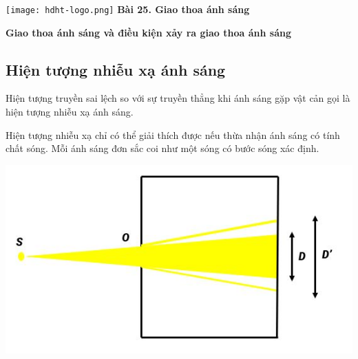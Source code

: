 \newcommand{\chapter}[2][]{
	\newcommand{\chapname}{#2}
	\begin{flushleft}
		\begin{minipage}[t]{\linewidth}
			\texttt{[image: hdht-logo.png]}
			\hspace{0pt}	
			\sffamily\bfseries\large Bài  25. Giao thoa ánh sáng
			\begin{flushleft}
				\huge\bfseries #1
			\end{flushleft}
		\end{minipage}
	\end{flushleft}
	\vspace{1cm}
	\normalfont\normalsize
}
\chapter[Giao thoa ánh sáng và điều kiện xảy ra giao thoa ánh sáng]{Giao thoa ánh sáng \\và điều kiện xảy ra giao thoa ánh sáng}

\subsection{Hiện tượng nhiễu xạ ánh sáng}
Hiện tượng truyền sai lệch so với sự truyền thẳng khi ánh sáng gặp vật cản gọi là hiện tượng nhiễu xạ ánh sáng.

Hiện tượng nhiễu xạ chỉ có thể giải thích được nếu thừa nhận ánh sáng có tính chất sóng. Mỗi ánh sáng đơn sắc coi như một sóng có bước sóng xác định.
\begin{center}
	\includegraphics[scale=0.7]{../figs/VN12-PH-33-L-020-1-2.JPG}
\end{center}

